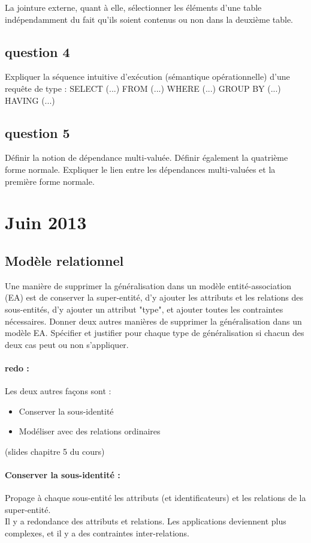 La jointure externe, quant à elle, sélectionner les éléments d'une table 
indépendamment du fait qu'ils soient contenus ou non dans la deuxième table. 




\subsection{question 4}
Expliquer la séquence intuitive d’exécution (sémantique opérationnelle) d’une requête de type :
SELECT (...) FROM (...) WHERE (...) GROUP BY (...) HAVING (...)

\subsection{question 5}
Définir la notion de dépendance multi-valuée. Définir également la quatrième forme normale.
Expliquer le lien entre les dépendances multi-valuées et la première forme normale.


\section{Juin 2013}

\subsection{Modèle relationnel}
Une manière de supprimer la généralisation dans un modèle entité-association (EA)
est de conserver la super-entité, d'y ajouter les attributs et les relations 
des sous-entités, d'y ajouter un attribut "type", et ajouter toutes les 
contraintes nécessaires. Donner deux autres manières de supprimer la 
généralisation dans un modèle EA. Spécifier et justifier pour chaque type de généralisation 
si chacun des deux cas peut ou non s'appliquer. 

\paragraph{redo :}
Les deux autres façons sont : 
\begin{itemize}
	\item Conserver la sous-identité 
	\item Modéliser avec des relations ordinaires
\end{itemize}
(slides chapitre 5 du cours)
\paragraph{Conserver la sous-identité :} Propage à chaque sous-entité les attributs 
(et identificateurs) et les relations de la super-entité.\\
Il y a redondance des attributs et relations. Les applications deviennent plus 
complexes, et il y a des contraintes inter-relations.

